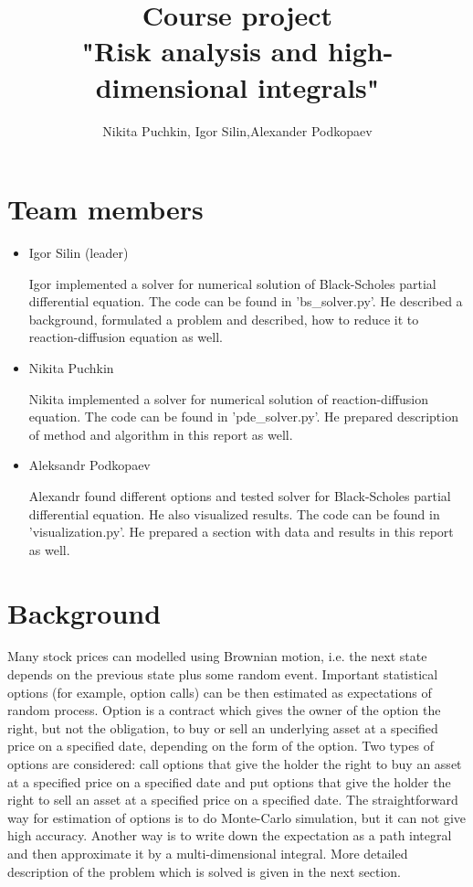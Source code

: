 \documentclass[11pt,a4paper]{extarticle}
\title{Course project \\
"Risk analysis and high-dimensional integrals"}
\author{ Nikita Puchkin, Igor Silin,Alexander Podkopaev }
\begin{document}
\maketitle

\section{Team members}

\begin{itemize}

\item Igor Silin (leader)

Igor implemented a solver for numerical solution of Black-Scholes partial differential equation.
The code can be found in 'bs\_solver.py'.
He described a background, formulated a problem and described, how to reduce it to reaction-diffusion equation as well.

\item Nikita Puchkin

Nikita implemented a solver for numerical solution of reaction-diffusion equation.
The code can be found in 'pde\_solver.py'.
He prepared description of method and algorithm in this report as well. 

\item Aleksandr Podkopaev

Alexandr found different options and tested solver for Black-Scholes partial differential equation.
He also visualized results.
The code can be found in 'visualization.py'.
He prepared a section with data and results in this report as well.

\end{itemize}

\section{Background}

Many stock prices can modelled using Brownian motion, i.e. the next state depends on the previous state plus some random event. Important statistical options (for example, option calls) can be then estimated as expectations of random process. Option is a contract which gives the owner of the option the right, but not the obligation, to buy or sell an underlying asset at a specified price on a specified date, depending on the form of the option. Two types of options are considered: call options that give the holder the right to buy an asset at a specified price on a specified date and put options that give the holder the right to sell an asset at a specified price on a specified date. The straightforward way for estimation of options is to do Monte-Carlo simulation, but it can not give high accuracy. Another way is to write down the expectation as a path integral and then approximate it by a multi-dimensional integral. More detailed description of the problem which is solved is given in the next section.
\end{document}
